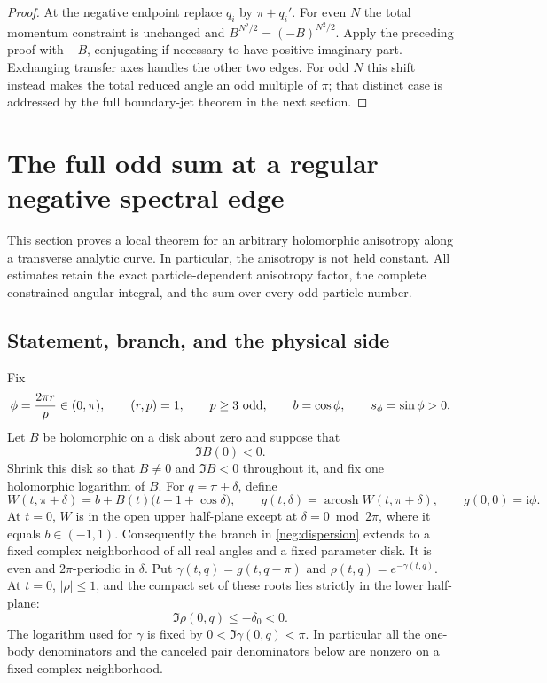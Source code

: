 \documentclass[11pt]{article}
\numberwithin{equation}{section}
\theoremstyle{definition}
\newcommand{\ii}{\mathrm i}
\begin{document}
\begin{proof}
At the negative endpoint replace \(q_i\) by \(\pi+q_i'\).
For even \(N\) the total momentum constraint is unchanged and
\(B^{N^2/2}=(-B)^{N^2/2}\). Apply the preceding proof with
\(-B\), conjugating if necessary to have positive imaginary part.
Exchanging transfer axes handles the other two edges.
For odd \(N\) this shift instead makes the total reduced angle
an odd multiple of \(\pi\); that distinct case is addressed by
the full boundary-jet theorem in the next section.
\end{proof}

\section{The full odd sum at a regular negative spectral edge}
\label{neg:section}

This section proves a local theorem for an arbitrary holomorphic
anisotropy along a transverse analytic curve.  In particular, the
anisotropy is not held constant.  All estimates retain the exact
particle-dependent anisotropy factor, the complete constrained angular
integral, and the sum over every odd particle number.

\subsection{Statement, branch, and the physical side}
\label{neg:setup}

Fix
\begin{equation}
 \phi=\frac{2\pi r}{p}\in(0,\pi),\qquad
 (r,p)=1,\qquad p\ge3\ \hbox{odd},\qquad
 b=\cos\phi,\qquad s_\phi=\sin\phi>0 .
 \label{neg:rational}
\end{equation}
Let \(B\) be holomorphic on a disk about zero and suppose that
\begin{equation}
 \Im B(0)<0 .
 \label{neg:orientation}
\end{equation}
Shrink this disk so that \(B\ne0\) and \(\Im B<0\) throughout it, and
fix one holomorphic logarithm of \(B\).  For \(q=\pi+\delta\), define
\begin{equation}
 W(t,\pi+\delta)
   =b+B(t)\bigl(t-1+\cos\delta\bigr),\qquad
 g(t,\delta)=\operatorname{arcosh}W(t,\pi+\delta),\qquad
 g(0,0)=\ii\phi .
 \label{neg:dispersion}
\end{equation}
At \(t=0\), \(W\) is in the open upper half-plane except at
\(\delta=0\bmod 2\pi\), where it equals \(b\in(-1,1)\).  Consequently
the branch in \eqref{neg:dispersion} extends to a fixed complex
neighborhood of all real angles and a fixed parameter disk.  It is
even and \(2\pi\)-periodic in \(\delta\).  Put
\(\gamma(t,q)=g(t,q-\pi)\) and \(\rho(t,q)=e^{-\gamma(t,q)}\).
At \(t=0\), \(|\rho|\le1\), and the compact set of these roots lies
strictly in the lower half-plane:
\begin{equation}
 \Im\rho(0,q)\le-\delta_0<0 .
 \label{neg:root-compact}
\end{equation}
The logarithm used for \(\gamma\) is fixed by
\(0<\Im\gamma(0,q)<\pi\).  In particular all the one-body
denominators and the canceled pair denominators below are nonzero on
a fixed complex neighborhood.
\end{document}
